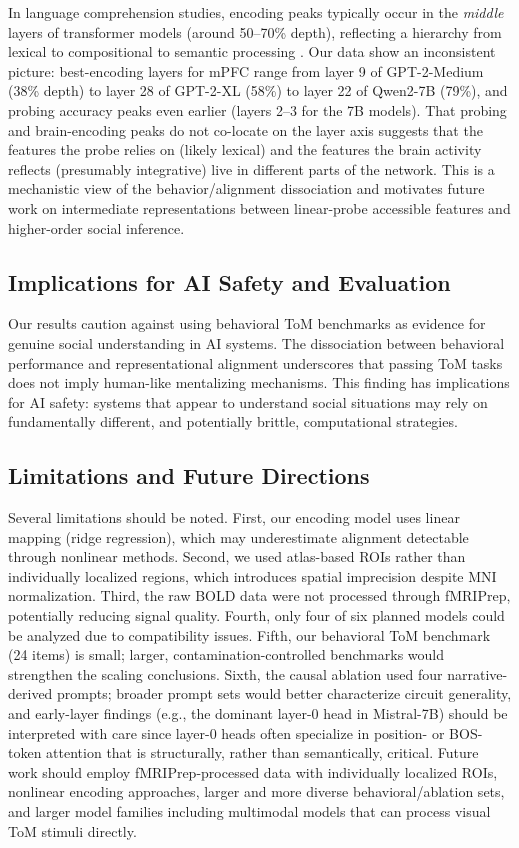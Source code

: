 \documentclass[conference]{IEEEtran}
\begin{document}
In language comprehension studies, encoding peaks typically occur in the \textit{middle} layers of transformer models (around 50--70\% depth), reflecting a hierarchy from lexical to compositional to semantic processing \cite{caucheteux2022brains, schrimpf2021neural}. Our data show an inconsistent picture: best-encoding layers for mPFC range from layer 9 of GPT-2-Medium (38\% depth) to layer 28 of GPT-2-XL (58\%) to layer 22 of Qwen2-7B (79\%), and probing accuracy peaks even earlier (layers 2--3 for the 7B models). That probing and brain-encoding peaks do not co-locate on the layer axis suggests that the features the probe relies on (likely lexical) and the features the brain activity reflects (presumably integrative) live in different parts of the network. This is a mechanistic view of the behavior/alignment dissociation and motivates future work on intermediate representations between linear-probe accessible features and higher-order social inference.

\subsection{Implications for AI Safety and Evaluation}

Our results caution against using behavioral ToM benchmarks as evidence for genuine social understanding in AI systems. The dissociation between behavioral performance and representational alignment underscores that passing ToM tasks does not imply human-like mentalizing mechanisms. This finding has implications for AI safety: systems that appear to understand social situations may rely on fundamentally different, and potentially brittle, computational strategies.

\subsection{Limitations and Future Directions}

Several limitations should be noted. First, our encoding model uses linear mapping (ridge regression), which may underestimate alignment detectable through nonlinear methods. Second, we used atlas-based ROIs rather than individually localized regions, which introduces spatial imprecision despite MNI normalization. Third, the raw BOLD data were not processed through fMRIPrep, potentially reducing signal quality. Fourth, only four of six planned models could be analyzed due to compatibility issues. Fifth, our behavioral ToM benchmark (24 items) is small; larger, contamination-controlled benchmarks would strengthen the scaling conclusions. Sixth, the causal ablation used four narrative-derived prompts; broader prompt sets would better characterize circuit generality, and early-layer findings (e.g., the dominant layer-0 head in Mistral-7B) should be interpreted with care since layer-0 heads often specialize in position- or BOS-token attention that is structurally, rather than semantically, critical. Future work should employ fMRIPrep-processed data with individually localized ROIs, nonlinear encoding approaches, larger and more diverse behavioral/ablation sets, and larger model families including multimodal models that can process visual ToM stimuli directly.
\end{document}
